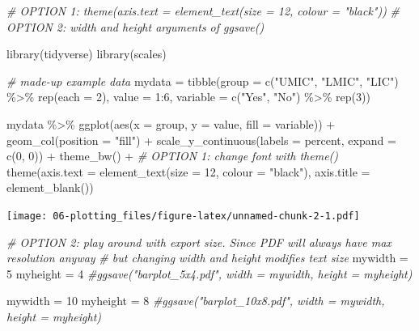 \documentclass[
]{book}
\newenvironment{Shaded}{\begin{snugshade}}{\end{snugshade}}
\newcommand{\AttributeTok}[1]{\textcolor[rgb]{0.77,0.63,0.00}{#1}}
\newcommand{\CommentTok}[1]{\textcolor[rgb]{0.56,0.35,0.01}{\textit{#1}}}
\newcommand{\DecValTok}[1]{\textcolor[rgb]{0.00,0.00,0.81}{#1}}
\newcommand{\FunctionTok}[1]{\textcolor[rgb]{0.00,0.00,0.00}{#1}}
\newcommand{\NormalTok}[1]{#1}
\newcommand{\OtherTok}[1]{\textcolor[rgb]{0.56,0.35,0.01}{#1}}
\newcommand{\SpecialCharTok}[1]{\textcolor[rgb]{0.00,0.00,0.00}{#1}}
\newcommand{\StringTok}[1]{\textcolor[rgb]{0.31,0.60,0.02}{#1}}
\begin{document}
\begin{Shaded}
\begin{Highlighting}[]
\CommentTok{\# OPTION 1: theme(axis.text = element\_text(size = 12, colour = "black"))}
\CommentTok{\# OPTION 2: width and height arguments of ggsave()}

\FunctionTok{library}\NormalTok{(tidyverse)}
\FunctionTok{library}\NormalTok{(scales)}

\CommentTok{\# made{-}up example data}
\NormalTok{mydata }\OtherTok{=} \FunctionTok{tibble}\NormalTok{(}\AttributeTok{group    =} \FunctionTok{c}\NormalTok{(}\StringTok{"UMIC"}\NormalTok{, }\StringTok{"LMIC"}\NormalTok{, }\StringTok{"LIC"}\NormalTok{) }\SpecialCharTok{\%\textgreater{}\%} \FunctionTok{rep}\NormalTok{(}\AttributeTok{each =} \DecValTok{2}\NormalTok{),}
                \AttributeTok{value    =} \DecValTok{1}\SpecialCharTok{:}\DecValTok{6}\NormalTok{, }
                \AttributeTok{variable =} \FunctionTok{c}\NormalTok{(}\StringTok{"Yes"}\NormalTok{, }\StringTok{"No"}\NormalTok{) }\SpecialCharTok{\%\textgreater{}\%} \FunctionTok{rep}\NormalTok{(}\DecValTok{3}\NormalTok{))}

\NormalTok{mydata }\SpecialCharTok{\%\textgreater{}\%} 
  \FunctionTok{ggplot}\NormalTok{(}\FunctionTok{aes}\NormalTok{(}\AttributeTok{x =}\NormalTok{ group, }\AttributeTok{y =}\NormalTok{ value, }\AttributeTok{fill =}\NormalTok{ variable)) }\SpecialCharTok{+}
  \FunctionTok{geom\_col}\NormalTok{(}\AttributeTok{position =} \StringTok{"fill"}\NormalTok{) }\SpecialCharTok{+}
  \FunctionTok{scale\_y\_continuous}\NormalTok{(}\AttributeTok{labels =}\NormalTok{ percent, }\AttributeTok{expand =} \FunctionTok{c}\NormalTok{(}\DecValTok{0}\NormalTok{, }\DecValTok{0}\NormalTok{)) }\SpecialCharTok{+}
  \FunctionTok{theme\_bw}\NormalTok{() }\SpecialCharTok{+}
  \CommentTok{\# OPTION 1: change font with theme()}
  \FunctionTok{theme}\NormalTok{(}\AttributeTok{axis.text  =} \FunctionTok{element\_text}\NormalTok{(}\AttributeTok{size =} \DecValTok{12}\NormalTok{, }\AttributeTok{colour =} \StringTok{"black"}\NormalTok{),}
        \AttributeTok{axis.title =} \FunctionTok{element\_blank}\NormalTok{())}
\end{Highlighting}
\end{Shaded}

\texttt{[image: 06-plotting\_files/figure-latex/unnamed-chunk-2-1.pdf]}

\begin{Shaded}
\begin{Highlighting}[]
\CommentTok{\# OPTION 2: play around with export size. Since PDF will always have max resolution anyway}
\CommentTok{\# but changing width and height modifies text size}
\NormalTok{mywidth  }\OtherTok{=} \DecValTok{5}
\NormalTok{myheight }\OtherTok{=} \DecValTok{4}
\CommentTok{\#ggsave("barplot\_5x4.pdf", width = mywidth, height = myheight)}

\NormalTok{mywidth  }\OtherTok{=} \DecValTok{10}
\NormalTok{myheight }\OtherTok{=} \DecValTok{8}
\CommentTok{\#ggsave("barplot\_10x8.pdf", width = mywidth, height = myheight)}
\end{Highlighting}
\end{Shaded}
\end{document}
